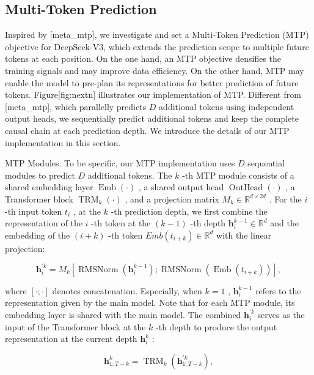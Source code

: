 \documentclass[11pt,a4paper]{article}
\begin{document}
\subsection{Multi-Token Prediction}

Inspired by [meta\_mtp], we investigate and set a Multi-Token Prediction (MTP) objective for DeepSeek-V3, which extends the prediction scope to multiple future tokens at each position. On the one hand, an MTP objective densifies the training signals and may improve data efficiency. On the other hand, MTP may enable the model to pre-plan its representations for better prediction of future tokens. Figure[fig:nextn] illustrates our implementation of MTP. Different from [meta\_mtp], which parallelly predicts  $D$  additional tokens using independent output heads, we sequentially predict additional tokens and keep the complete causal chain at each prediction depth. We introduce the details of our MTP implementation in this section.

MTP Modules. To be specific, our MTP implementation uses  $D$  sequential modules to predict  $D$  additional tokens. The  $k$ -th MTP module consists of a shared embedding layer  $\operatorname{Emb}(\cdot)$ , a shared output head  $\operatorname{OutHead}(\cdot)$ , a Transformer block  $\operatorname{TRM}_k(\cdot)$ , and a projection matrix  $M_k \in \mathbb{R}^{d \times 2d}$ . For the  $i$ -th input token  $t_i$ , at the  $k$ -th prediction depth, we first combine the representation of the  $i$ -th token at the  $(k-1)$ -th depth  $\mathbf{h}_i^{k-1} \in \mathbb{R}^{d}$  and the embedding of the  $(i+k)$ -th token  $Emb(t_{i+k}) \in \mathbb{R}^{d}$  with the linear projection:

$$\begin{equation}
    \mathbf{h}_i^{\prime k} = M_k [\operatorname{RMSNorm}(\mathbf{h}_i^{k-1}) ; \operatorname{RMSNorm}(\operatorname{Emb}(t_{i+k}))],
\end{equation}$$

where  $[\cdot ; \cdot]$  denotes concatenation. Especially, when  $k=1$ ,  $\mathbf{h}_i^{k-1}$  refers to the representation given by the main model. Note that for each MTP module, its embedding layer is shared with the main model. The combined  $\mathbf{h}_i^{\prime k}$  serves as the input of the Transformer block at the  $k$ -th depth to produce the output representation at the current depth  $\mathbf{h}_{i}^{k}$ :

$$\begin{equation}
    \mathbf{h}_{1:T-k}^{k} = \operatorname{TRM}_k(\mathbf{h}_{1:T-k}^{\prime k}),
\end{equation}$$
\end{document}
